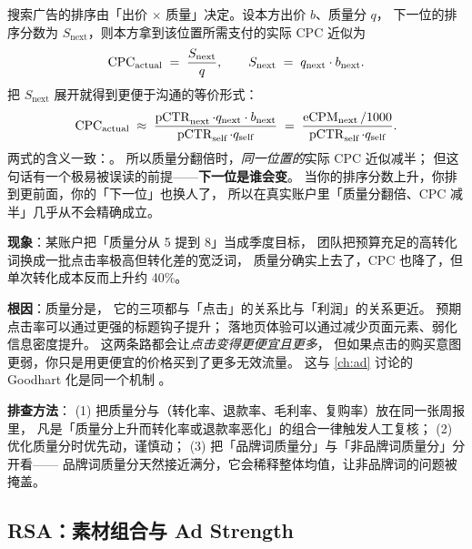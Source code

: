 \begin{formulacard}
搜索广告的排序由「出价 $\times$ 质量」决定。设本方出价 $b$、质量分 $q$，
下一位的排序分数为 $S_{\text{next}}$，则本方拿到该位置所需支付的实际 CPC 近似为
\begin{equation}
\operatorname{CPC}_{\text{actual}} \;=\; \frac{S_{\text{next}}}{q} ,
\qquad S_{\text{next}} \;=\; q_{\text{next}} \cdot b_{\text{next}} .
\label{eq:g-cpc-qs}
\end{equation}
把 $S_{\text{next}}$ 展开就得到更便于沟通的等价形式：
\begin{equation}
\operatorname{CPC}_{\text{actual}} \;\approx\;
\frac{\operatorname{pCTR}_{\text{next}} \cdot q_{\text{next}} \cdot b_{\text{next}}}{\operatorname{pCTR}_{\text{self}} \cdot q_{\text{self}}}
\;=\;
\frac{\operatorname{eCPM}_{\text{next}}/1000}{\operatorname{pCTR}_{\text{self}} \cdot q_{\text{self}}} .
\label{eq:g-cpc-ecpm}
\end{equation}
两式的含义一致：。
所以质量分翻倍时，\emph{同一位置的}实际 CPC 近似减半；
但这句话有一个极易被误读的前提——\textbf{下一位是谁会变}。
当你的排序分数上升，你排到更前面，你的「下一位」也换人了，
所以在真实账户里「质量分翻倍、CPC 减半」几乎从不会精确成立。
\end{formulacard}

\begin{pitfall}
\textbf{现象}：某账户把「质量分从 5 提到 8」当成季度目标，
团队把预算充足的高转化词换成一批点击率极高但转化差的宽泛词，
质量分确实上去了，CPC 也降了，但单次转化成本反而上升约 40\%。

\textbf{根因}：质量分是，
它的三项都与「点击」的关系比与「利润」的关系更近。
预期点击率可以通过更强的标题钩子提升；
落地页体验可以通过减少页面元素、弱化信息密度提升。
这两条路都会让\emph{点击变得更便宜且更多}，
但如果点击的购买意图更弱，你只是用更便宜的价格买到了更多无效流量。
这与 \cref{ch:ad} 讨论的 Goodhart 化是同一个机制 \cite{goodhart1975}。

\textbf{排查方法}：
(1) 把质量分与（转化率、退款率、毛利率、复购率）放在同一张周报里，
凡是「质量分上升而转化率或退款率恶化」的组合一律触发人工复核；
(2) 优化质量分时优先动，谨慎动；
(3) 把「品牌词质量分」与「非品牌词质量分」分开看——
品牌词质量分天然接近满分，它会稀释整体均值，让非品牌词的问题被掩盖。
\end{pitfall}

\subsection{RSA：素材组合与 Ad Strength}

